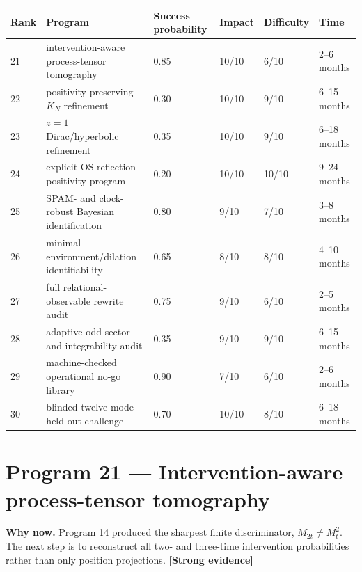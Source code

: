\documentclass[11pt,a4paper,openany]{report}
\newcommand{\statusStrong}{\textcolor{finblue}{[Strong evidence]}}
\begin{document}
\begin{center}
\begingroup\footnotesize
\setlength{\tabcolsep}{3.5pt}
\renewcommand{\arraystretch}{1.16}
\begin{longtable}{@{}p{}p{}p{}p{}p{}p{}@{}}
\toprule
\textbf{Rank} & \textbf{Program} & \textbf{Success probability} & \textbf{Impact} & \textbf{Difficulty} & \textbf{Time} \\
\midrule
\endhead
21 & intervention-aware process-tensor tomography & 0.85 & 10/\allowbreak{}10 & 6/\allowbreak{}10 & 2–6 months \\
22 & positivity-preserving \(K_N\) refinement & 0.30 & 10/\allowbreak{}10 & 9/\allowbreak{}10 & 6–15 months \\
23 & \(z=1\) Dirac/\allowbreak{}hyperbolic refinement & 0.35 & 10/\allowbreak{}10 & 9/\allowbreak{}10 & 6–18 months \\
24 & explicit OS-reflection-positivity program & 0.20 & 10/\allowbreak{}10 & 10/\allowbreak{}10 & 9–24 months \\
25 & SPAM- and clock-robust Bayesian identification & 0.80 & 9/\allowbreak{}10 & 7/\allowbreak{}10 & 3–8 months \\
26 & minimal-environment/\allowbreak{}dilation identifiability & 0.65 & 8/\allowbreak{}10 & 8/\allowbreak{}10 & 4–10 months \\
27 & full relational-observable rewrite audit & 0.75 & 9/\allowbreak{}10 & 6/\allowbreak{}10 & 2–5 months \\
28 & adaptive odd-sector and integrability audit & 0.35 & 9/\allowbreak{}10 & 9/\allowbreak{}10 & 6–15 months \\
29 & machine-checked operational no-go library & 0.90 & 7/\allowbreak{}10 & 6/\allowbreak{}10 & 2–6 months \\
30 & blinded twelve-mode held-out challenge & 0.70 & 10/\allowbreak{}10 & 8/\allowbreak{}10 & 6–18 months \\
\bottomrule
\end{longtable}
\endgroup
\end{center}

\section{Program 21 — Intervention-aware process-tensor tomography}

\textbf{Why now.} Program 14 produced the sharpest finite discriminator, \(M_{2t}\ne M_t^2\). The next step is to reconstruct all two- and three-time intervention probabilities rather than only position projections. \textbf{\statusStrong{}}
\end{document}
